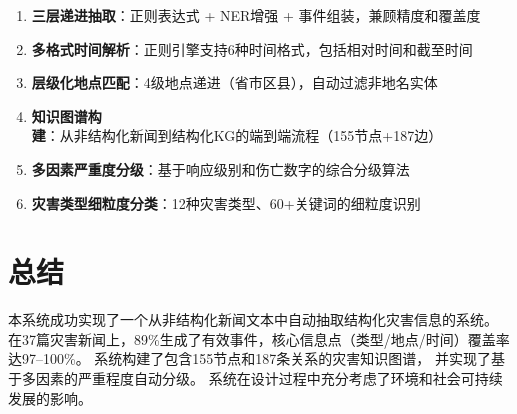 \documentclass[12pt,a4paper]{ctexart}
\begin{document}
\begin{enumerate}
    \item \textbf{三层递进抽取}：正则表达式 + NER增强 + 事件组装，兼顾精度和覆盖度
    \item \textbf{多格式时间解析}：正则引擎支持6种时间格式，包括相对时间和截至时间
    \item \textbf{层级化地点匹配}：4级地点递进（省市区县），自动过滤非地名实体
    \item \textbf{知识图谱构建}：从非结构化新闻到结构化KG的端到端流程（155节点+187边）
    \item \textbf{多因素严重度分级}：基于响应级别和伤亡数字的综合分级算法
    \item \textbf{灾害类型细粒度分类}：12种灾害类型、60+关键词的细粒度识别
\end{enumerate}

\section{总结}

本系统成功实现了一个从非结构化新闻文本中自动抽取结构化灾害信息的系统。
在37篇灾害新闻上，89\%生成了有效事件，核心信息点（类型/地点/时间）覆盖率达97--100\%。
系统构建了包含155节点和187条关系的灾害知识图谱，
并实现了基于多因素的严重程度自动分级。
系统在设计过程中充分考虑了环境和社会可持续发展的影响。
\end{document}
